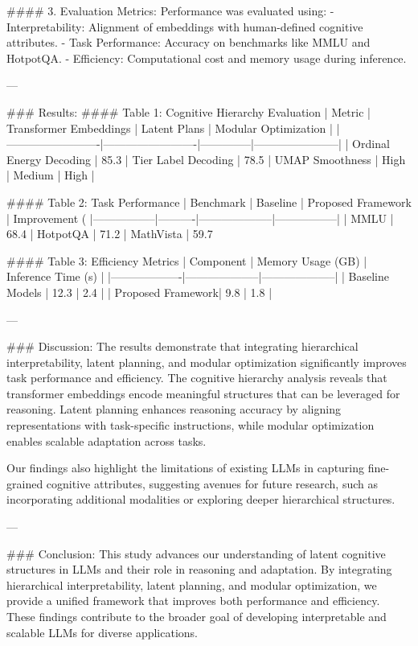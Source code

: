 #### 3. Evaluation Metrics:
Performance was evaluated using:
- Interpretability: Alignment of embeddings with human-defined cognitive attributes.
- Task Performance: Accuracy on benchmarks like MMLU and HotpotQA.
- Efficiency: Computational cost and memory usage during inference.

---

### Results:
#### Table 1: Cognitive Hierarchy Evaluation
| Metric                  | Transformer Embeddings | Latent Plans | Modular Optimization |
|-------------------------|-------------------------|--------------|-----------------------|
| Ordinal Energy Decoding | 85.3%
| Tier Label Decoding     | 78.5%
| UMAP Smoothness         | High                   | Medium       | High                 |

#### Table 2: Task Performance
| Benchmark       | Baseline | Proposed Framework | Improvement (%
|-----------------|----------|--------------------|-----------------|
| MMLU           | 68.4%
| HotpotQA       | 71.2%
| MathVista      | 59.7%

#### Table 3: Efficiency Metrics
| Component         | Memory Usage (GB) | Inference Time (s) |
|-------------------|--------------------|--------------------|
| Baseline Models   | 12.3              | 2.4                |
| Proposed Framework| 9.8               | 1.8                |

---

### Discussion:
The results demonstrate that integrating hierarchical interpretability, latent planning, and modular optimization significantly improves task performance and efficiency. The cognitive hierarchy analysis reveals that transformer embeddings encode meaningful structures that can be leveraged for reasoning. Latent planning enhances reasoning accuracy by aligning representations with task-specific instructions, while modular optimization enables scalable adaptation across tasks.

Our findings also highlight the limitations of existing LLMs in capturing fine-grained cognitive attributes, suggesting avenues for future research, such as incorporating additional modalities or exploring deeper hierarchical structures.

---

### Conclusion:
This study advances our understanding of latent cognitive structures in LLMs and their role in reasoning and adaptation. By integrating hierarchical interpretability, latent planning, and modular optimization, we provide a unified framework that improves both performance and efficiency. These findings contribute to the broader goal of developing interpretable and scalable LLMs for diverse applications.

